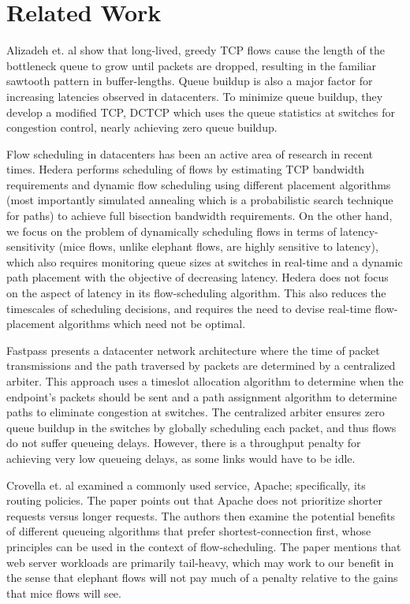 \section{Related Work}
Alizadeh et. al \cite{dctcp} show that long-lived, greedy TCP flows cause the length of the bottleneck queue to grow until packets are dropped, resulting in the familiar sawtooth pattern in buffer-lengths. Queue buildup is also a major factor for increasing latencies observed in datacenters. To minimize queue buildup, they develop a modified TCP, DCTCP which uses the queue statistics at switches for congestion control, nearly achieving zero queue buildup. 

Flow scheduling in datacenters has been an active area of research in recent times. Hedera \cite{hedera} performs scheduling of flows by estimating TCP bandwidth requirements and dynamic flow scheduling using different placement algorithms (most importantly simulated annealing which is a probabilistic search technique for paths) to achieve full bisection bandwidth requirements. On the other hand, we focus on the problem of dynamically scheduling flows in terms of latency-sensitivity (mice flows, unlike elephant flows, are highly sensitive to latency), which also requires monitoring queue sizes at switches in real-time and a dynamic path placement with the objective of decreasing latency. Hedera does not focus on the aspect of latency in its flow-scheduling algorithm. This also reduces the timescales of scheduling decisions, and requires the need to devise real-time flow-placement algorithms which need not be optimal. 

Fastpass \cite{fastpass} presents a datacenter network architecture where the time of packet transmissions and the path traversed by packets are determined by a centralized arbiter. This approach uses a timeslot allocation algorithm to determine when the endpoint’s packets should be sent and a path assignment algorithm to determine paths to eliminate congestion at switches. The centralized arbiter ensures zero queue buildup in the switches by globally scheduling each packet, and thus flows do not suffer queueing delays. However, there is a throughput penalty for achieving very low queueing delays, as some links would have to be idle. 
 
 Crovella et. al \cite{CFH99} examined a commonly used service, Apache; specifically, its routing policies. The paper points out that Apache does not prioritize shorter requests versus longer requests. The authors then examine the potential benefits of different queueing algorithms that prefer shortest-connection first, whose principles can be used in the context of flow-scheduling. The paper mentions that web server workloads are primarily tail-heavy, which may work to our benefit in the sense that elephant flows will not pay much of a penalty relative to the gains that mice flows will see. 